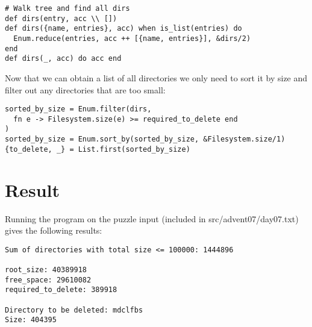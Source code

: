 \documentclass[a4paper,11pt]{article}
\begin{document}
\begin{verbatim}
# Walk tree and find all dirs
def dirs(entry, acc \\ [])
def dirs({name, entries}, acc) when is_list(entries) do
  Enum.reduce(entries, acc ++ [{name, entries}], &dirs/2)
end
def dirs(_, acc) do acc end
\end{verbatim}

Now that we can obtain a list of all directories we only need to sort it by size and filter out any directories that are too small:
\begin{verbatim}
sorted_by_size = Enum.filter(dirs,
  fn e -> Filesystem.size(e) >= required_to_delete end
)
sorted_by_size = Enum.sort_by(sorted_by_size, &Filesystem.size/1)
{to_delete, _} = List.first(sorted_by_size)
\end{verbatim}

\section*{Result}

Running the program on the puzzle input (included in src/advent07/day07.txt) gives the following results:

\begin{verbatim}
Sum of directories with total size <= 100000: 1444896

root_size: 40389918
free_space: 29610082
required_to_delete: 389918

Directory to be deleted: mdclfbs
Size: 404395
\end{verbatim}
\end{document}
